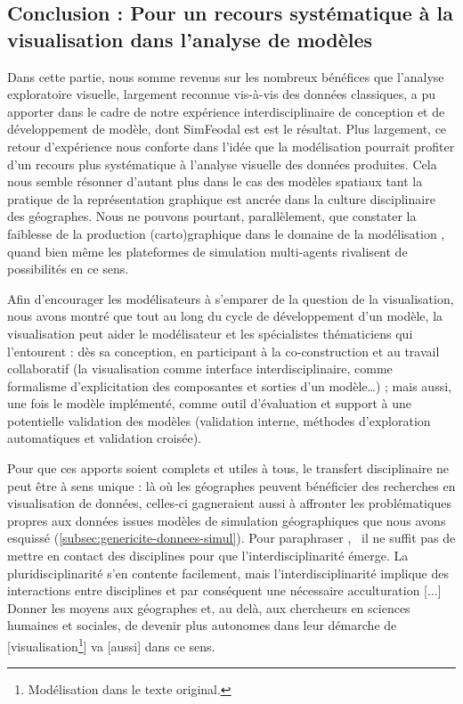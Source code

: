 \subsection{Conclusion : Pour un recours systématique à la visualisation dans l'analyse de modèles}
Dans cette partie, nous somme revenus sur les nombreux bénéfices que l'analyse exploratoire visuelle, largement reconnue vis-à-vis des données classiques, a pu apporter dans le cadre de notre expérience interdisciplinaire de conception et de développement de modèle, dont SimFeodal est est le résultat.
Plus largement, ce retour d'expérience nous conforte dans l'idée que la modélisation pourrait profiter d'un recours plus systématique à l'analyse visuelle des données produites.
Cela nous semble résonner d'autant plus dans le cas des modèles spatiaux tant la pratique de la représentation graphique est ancrée dans la culture disciplinaire des géographes.
Nous ne pouvons pourtant, parallèlement, que constater la faiblesse de la production (carto)graphique dans le domaine de la modélisation \autocite[Introduction]{cura_visualisation_2020}, quand bien même les plateformes de simulation multi-agents rivalisent de possibilités en ce sens.

\noindent Afin d’encourager les modélisateurs à s’emparer de la question de la visualisation, nous avons montré que tout au long du cycle de développement d'un modèle, la visualisation peut aider le modélisateur et les spécialistes thématiciens qui l’entourent  :
dès sa conception, en participant à la co-construction et au travail collaboratif (la visualisation comme interface interdisciplinaire, comme formalisme d'explicitation des composantes et sorties d'un modèle\ldots) ;
mais aussi, une fois le modèle implémenté, comme outil d'évaluation et support à une potentielle validation des modèles (validation interne, méthodes d'exploration automatiques et validation croisée).

\noindent Pour que ces apports soient complets et utiles à tous, le transfert disciplinaire ne peut être à sens unique : là où les géographes peuvent bénéficier des recherches en visualisation de données, celles-ci gagneraient aussi à affronter les problématiques propres aux données issues modèles de simulation géographiques que nous avons esquissé (\cref{subsec:genericite-donnees-simul}).
Pour paraphraser \textcite[76]{banos_pour_2013}, \og il ne suffit pas de mettre en contact des disciplines pour que l’interdisciplinarité émerge.
La pluridisciplinarité s’en contente facilement, mais l’interdisciplinarité implique des interactions entre disciplines et par conséquent une nécessaire acculturation [...]
Donner les moyens aux géographes et, au delà, aux chercheurs en sciences humaines et sociales, de devenir plus autonomes dans leur démarche de [visualisation\footnote{
	\og Modélisation\fg{} dans le texte original.
}] va [aussi] dans ce sens\fg{}.


